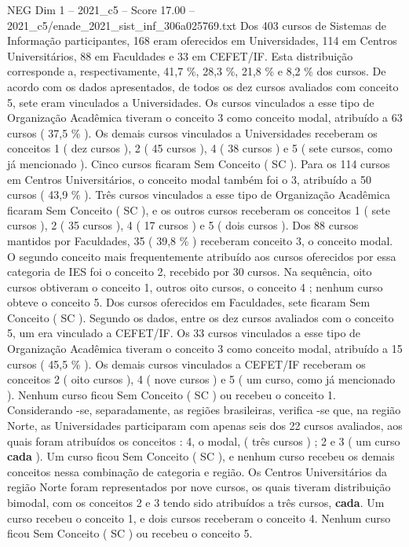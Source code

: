\begin{textsample}{NEG Dim 1 – 2021\_c5 – Score 17.00 – 2021\_c5/enade\_2021\_sist\_inf\_306a025769.txt}
Dos 403 cursos de Sistemas de Informação participantes, 168 eram oferecidos em Universidades, 114 em Centros Universitários, 88 em Faculdades e 33 em CEFET/IF.
Esta distribuição corresponde a, respectivamente, 41,7 \%, 28,3 \%, 21,8 \% e 8,2 \% dos cursos.
De acordo com os dados apresentados, de todos os dez cursos avaliados com conceito 5, sete eram vinculados a Universidades.
Os cursos vinculados a esse tipo de Organização Acadêmica tiveram o conceito 3 como conceito modal, atribuído a 63 cursos ( 37,5 \% ).
Os demais cursos vinculados a Universidades receberam os conceitos 1 ( dez cursos ), 2 ( 45 cursos ), 4 ( 38 cursos ) e 5 ( sete cursos, como já mencionado ).
Cinco cursos ficaram Sem Conceito ( SC ).
Para os 114 cursos em Centros Universitários, o conceito modal também foi o 3, atribuído a 50 cursos ( 43,9 \% ).
Três cursos vinculados a esse tipo de Organização Acadêmica ficaram Sem Conceito ( SC ), e os outros cursos receberam os conceitos 1 ( sete cursos ), 2 ( 35 cursos ), 4 ( 17 cursos ) e 5 ( dois cursos ).
Dos 88 cursos mantidos por Faculdades, 35 ( 39,8 \% ) receberam conceito 3, o conceito modal.
O segundo conceito mais frequentemente atribuído aos cursos oferecidos por essa categoria de IES foi o conceito 2, recebido por 30 cursos.
Na sequência, oito cursos obtiveram o conceito 1, outros oito cursos, o conceito 4 ; nenhum curso obteve o conceito 5.
Dos cursos oferecidos em Faculdades, sete ficaram Sem Conceito ( SC ).
Segundo os dados, entre os dez cursos avaliados com o conceito 5, um era vinculado a CEFET/IF.
Os 33 cursos vinculados a esse tipo de Organização Acadêmica tiveram o conceito 3 como conceito modal, atribuído a 15 cursos ( 45,5 \% ).
Os demais cursos vinculados a CEFET/IF receberam os conceitos 2 ( oito cursos ), 4 ( nove cursos ) e 5 ( um curso, como já mencionado ).
Nenhum curso ficou Sem Conceito ( SC ) ou recebeu o conceito 1.
Considerando -se, separadamente, as regiões brasileiras, verifica -se que, na região Norte, as Universidades participaram com apenas seis dos 22 cursos avaliados, aos quais foram atribuídos os conceitos : 4, o modal, ( três cursos ) ; 2 e 3 ( um curso \textbf{cada} ).
Um curso ficou Sem Conceito ( SC ), e nenhum curso recebeu os demais conceitos nessa combinação de categoria e região.
Os Centros Universitários da região Norte foram representados por nove cursos, os quais tiveram distribuição bimodal, com os conceitos 2 e 3 tendo sido atribuídos a três cursos, \textbf{cada}.
Um curso recebeu o conceito 1, e dois cursos receberam o conceito 4.
Nenhum curso ficou Sem Conceito ( SC ) ou recebeu o conceito 5.

\end{textsample}
